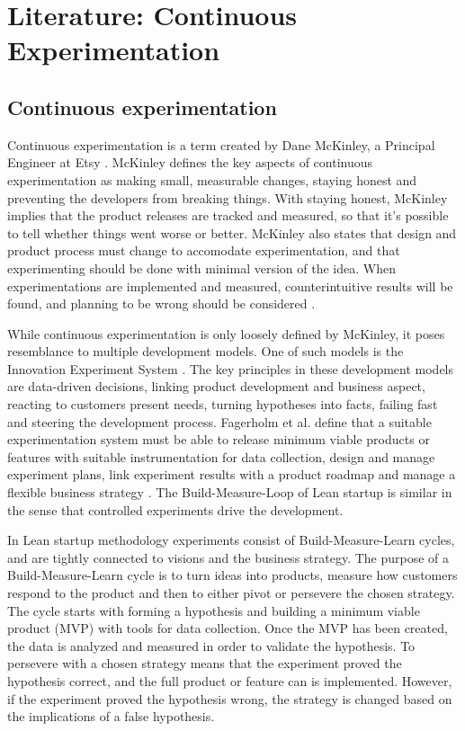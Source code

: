 \documentclass[english]{tktltiki2}
\theoremstyle{definition}
\theoremstyle{remark}
\begin{document}
\section{Literature: Continuous Experimentation}

\subsection{Continuous experimentation}

Continuous experimentation is a term created by Dane McKinley, a Principal Engineer at Etsy \cite{mcfunley}. McKinley defines the key aspects of continuous experimentation as making small, measurable changes, staying honest and preventing the developers from breaking things. With staying honest, McKinley implies that the product releases are tracked and measured, so that it's possible to tell whether things went worse or better. McKinley also states that design and product process must change to accomodate experimentation, and that experimenting should be done with minimal version of the idea. When experimentations are implemented and measured, counterintuitive results will be found, and planning to be wrong should be considered \cite{mcfunley}. 

While continuous experimentation is only loosely defined by McKinley, it poses resemblance to multiple development models. One of such models is the Innovation Experiment System \cite{bosch2012building}. The key principles in these development models are data-driven decisions, linking product development and business aspect, reacting to customers present needs, turning hypotheses into facts, failing fast and steering the development process. Fagerholm et al. define that a suitable experimentation system must be able to release minimum viable products or features with suitable instrumentation for data collection, design and manage experiment plans, link experiment results with a product roadmap and manage a flexible business strategy \cite{fagerholm2014building}. The Build-Measure-Loop of Lean startup is similar in the sense that controlled experiments drive the development.

In Lean startup methodology \cite{ries2011lean} experiments consist of Build-Measure-Learn cycles, and are tightly connected to visions and the business strategy. The purpose of a Build-Measure-Learn cycle is to turn ideas into products, measure how customers respond to the product and then to either pivot or persevere the chosen strategy. The cycle starts with forming a hypothesis and building a minimum viable product (MVP) with tools for data collection. Once the MVP has been created, the data is analyzed and measured in order to validate the hypothesis. To persevere with a chosen strategy means that the experiment proved the hypothesis correct, and the full product or feature can is implemented. However, if the experiment proved the hypothesis wrong, the strategy is changed based on the implications of a false hypothesis.
\end{document}
